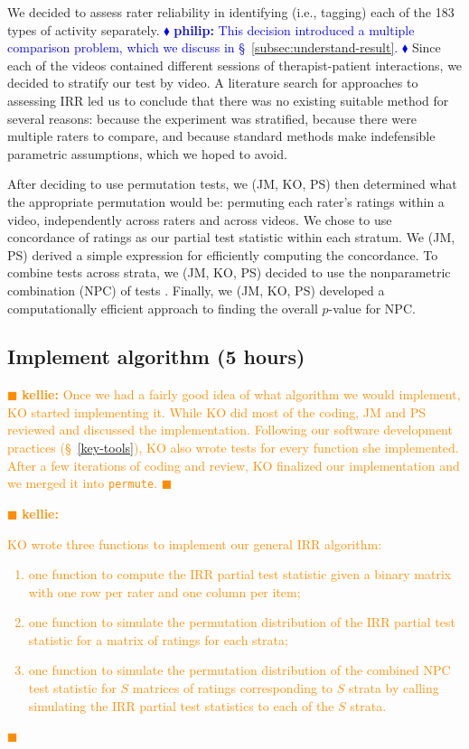 \documentclass[]{article}
\newcommand{\philip}[1] { \textcolor{blue} {
\ensuremath{\blacklozenge} {\bf philip:}  {#1}
\ensuremath{\blacklozenge} } }
\newcommand{\kellie}[1] { \textcolor{darkorange} {
\ensuremath{\blacksquare} {\bf kellie:}  {#1}
\ensuremath{\blacksquare} } }
\begin{document}
We decided to assess rater reliability in identifying (i.e., tagging)
each of the 183 types of activity separately.
\philip{
This decision introduced a multiple comparison problem, which we discuss in
\S~\ref{subsec:understand-result}.
}
Since each of the videos contained different sessions of therapist-patient
interactions, we decided to stratify our test by video.
A literature search for approaches to assessing IRR led us to conclude that
there was no existing suitable method for several reasons:
because the experiment was stratified,
because there were multiple raters to compare,
and because standard methods make indefensible parametric
assumptions, which we hoped to avoid.

After deciding to use permutation tests, we (JM, KO, PS) then determined what
the appropriate permutation would be: permuting each rater's ratings within a
video, independently across raters and across videos.
We chose to use concordance of ratings as our partial test statistic within
each stratum.
We (JM, PS) derived a simple expression for efficiently computing the
concordance.
To combine tests across strata, we (JM, KO, PS) decided to use the nonparametric
combination (NPC) of tests \citep{pesarin2010permutation}.
Finally, we (JM, KO, PS) developed a computationally efficient approach to
finding the overall $p$-value for NPC.

\subsection{Implement algorithm (5 hours)}

\kellie{
Once we had a fairly good idea of what algorithm we would implement, KO
started implementing it.
While KO did most of the coding, JM and PS reviewed and discussed the
implementation.
Following our software development practices (\S~\ref{key-tools}), KO also
wrote tests for every function she implemented.
After a few iterations of coding and review, KO finalized our implementation
and we merged it into \texttt{permute}.
}

\kellie{
KO wrote three functions to implement our general IRR algorithm:
\begin{enumerate}
\item one function to compute the IRR partial test statistic given a binary
  matrix with one row per rater and one column per item;
\item one function to simulate the permutation distribution of the IRR partial
  test statistic for a matrix of ratings for each strata;
\item one function to simulate the permutation  distribution of the combined
  NPC test statistic for $S$ matrices of ratings corresponding to $S$ strata
  by calling simulating the IRR partial test statistics to each of the $S$
  strata.
\end{enumerate}
}
\end{document}
